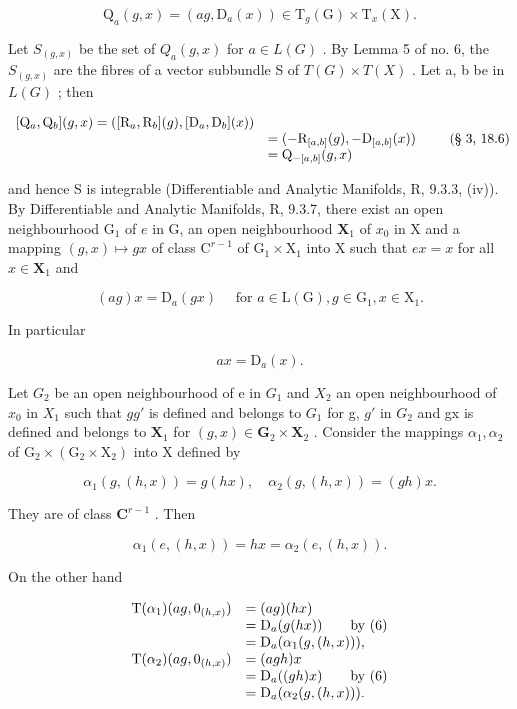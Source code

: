 \[
\mathrm{Q} _ {a} (g, x) = (a g, \mathrm{D} _ {a} (x)) \in \mathrm{T} _ {g} (\mathrm{G}) \times \mathrm{T} _ {x} (\mathrm{X}).
\]

Let \(S_{(g,x)}\) be the set of \(Q_{a}(g,x)\) for \(a\in L(G)\) . By Lemma 5 of no. 6, the \(S_{(g,x)}\) are the fibres of a vector subbundle S of \(T(G)\times T(X)\) . Let a, b be in \(L(G)\) ; then

\[
\begin{array}{r l} {[ \mathrm{Q} _ {a}, \mathrm{Q} _ {b} ] (g, x) = ([ \mathrm{R} _ {a}, \mathrm{R} _ {b} ] (g), [ \mathrm{D} _ {a}, \mathrm{D} _ {b} ] (x))} \\ & = (- \mathrm{R} _ {[ a, b ]} (g), - \mathrm{D} _ {[ a, b ]} (x)) \\ & = \mathrm{Q} _ {- [ a, b ]} (g, x) \end{array}\tag{§ 3, 18.6}
\]

and hence S is integrable (Differentiable and Analytic Manifolds, R, 9.3.3, (iv)). By Differentiable and Analytic Manifolds, R, 9.3.7, there exist an open neighbourhood \(\mathrm{G}_1\) of \(e\) in G, an open neighbourhood \(\mathbf{X}_1\) of \(x_0\) in X and a mapping \((g,x)\mapsto gx\) of class \(\mathrm{C}^{r - 1}\) of \(\mathrm{G}_1\times \mathrm{X}_1\) into X such that \(ex = x\) for all \(x\in \mathbf{X}_1\) and

\[
(a g) x = \mathrm{D} _ {a} (g x) \quad \text { for } a \in \mathrm{L} (\mathrm{G}), g \in \mathrm{G} _ {1}, x \in \mathrm{X} _ {1}.\tag{6}
\]

In particular

\[
a x = \mathrm{D} _ {a} (x).\tag{7}
\]

Let \(G_{2}\) be an open neighbourhood of e in \(G_{1}\) and \(X_{2}\) an open neighbourhood of \(x_{0}\) in \(X_{1}\) such that \(gg'\) is defined and belongs to \(G_{1}\) for g, \(g'\) in \(G_{2}\) and gx is defined and belongs to \(\mathbf{X}_1\) for \((g,x)\in \mathbf{G}_2\times \mathbf{X}_2\) . Consider the mappings \(\alpha_{1},\alpha_{2}\) of \(\mathrm{G}_2\times (\mathrm{G}_2\times \mathrm{X}_2)\) into X defined by

\[
\alpha_ {1} (g, (h, x)) = g (h x), \quad \alpha_ {2} (g, (h, x)) = (g h) x.
\]

They are of class \(\mathbf{C}^{r - 1}\) . Then

\[
\alpha_ {1} (e, (h, x)) = h x = \alpha_ {2} (e, (h, x)).
\]

On the other hand

\[
\begin{array}{r l} \mathrm{T} (\alpha_ {1}) (a g, 0 _ {(h, x)}) & = (a g) (h x) \\ & = \mathrm{D} _ {a} (g (h x)) \qquad \text {by (6)} \\ & = \mathrm{D} _ {a} (\alpha_ {1} (g, (h, x))), \\ \mathrm{T} (\alpha_ {2}) (a g, 0 _ {(h, x)}) & = (a g h) x \\ & = \mathrm{D} _ {a} ((g h) x) \qquad \text {by (6)} \\ & = \mathrm{D} _ {a} (\alpha_ {2} (g, (h, x))). \end{array}
\]

